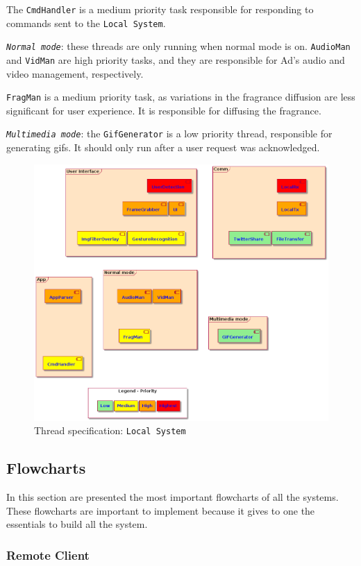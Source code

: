 \begin{enum-c}
  The \texttt{CmdHandler} is a medium priority task responsible for responding
  to commands sent to the \texttt{Local System}.
\item
  \emph{\texttt{Normal mode}}: these threads are only running when normal mode
  is on.
  \texttt{AudioMan} and \texttt{VidMan} are high priority tasks, and they are
  responsible for Ad's audio and video management, respectively.

  \texttt{FragMan} is a medium priority task, as variations in the fragrance
  diffusion are less significant for user experience. It is responsible for
  diffusing the fragrance.
\item
  \emph{\texttt{Multimedia mode}}: the \texttt{GifGenerator} is a low priority
  thread, responsible for generating \glspl{gif}. It should only run after a
  user request was acknowledged.
\end{enum-c}
%
\begin{figure}[htb!]
\centering
    \includegraphics[width=0.8\columnwidth]{./img/thread-spec-local.png}
  \caption{Thread specification: \texttt{Local System}}%
\label{fig:thread-spec-local}
\end{figure}
%
\subsection{Flowcharts}
\label{sec:flowcharts}

In this section are presented the most important flowcharts of all the systems. 
These flowcharts are important to implement because it gives to one the essentials to build all the system.

\subsubsection{Remote Client}
\label{sec:rc-flowcharts}

